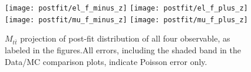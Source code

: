\begin{figure}[hbt]
  \begin{center}
    \texttt{[image: postfit/el\_f\_minus\_z]}
    \texttt{[image: postfit/el\_f\_plus\_z]}
    \texttt{[image: postfit/mu\_f\_minus\_z]}
    \texttt{[image: postfit/mu\_f\_plus\_z]}
  \caption{\small $M_{t\bar t}$ projection of post-fit distribution of all four observable, as labeled in the figures.All errors, including the shaded band in the Data/MC comparison plots, indicate Poisson error only.}
    \label{fig:postfit mtt}
  \end{center}
\end{figure}